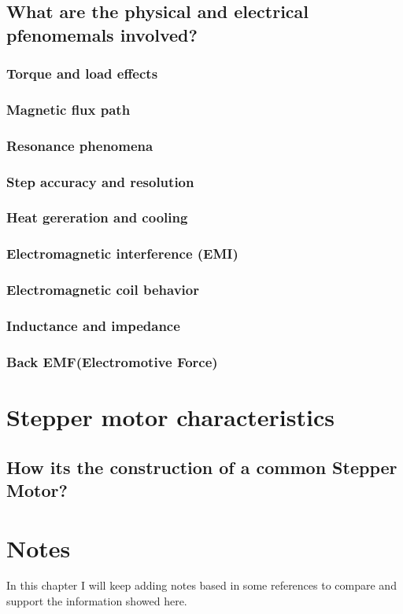 \documentclass{report}
\begin{document}
\section{What are the physical and electrical pfenomemals involved?}
\subsection{Torque and load effects}
\subsection{Magnetic flux path}
\subsection{Resonance phenomena}
\subsection{Step accuracy and resolution}
\subsection{Heat gereration and cooling}
\subsection{Electromagnetic interference (EMI)}
\subsection{Electromagnetic coil behavior}
\subsection{Inductance and impedance}
\subsection{Back EMF(Electromotive Force)}

\chapter{Stepper motor characteristics}
\section{How its the construction of a common Stepper Motor?}

\chapter{Notes}
In this chapter I will keep adding notes based in some references to compare and support the information 
showed here.
\end{document}
